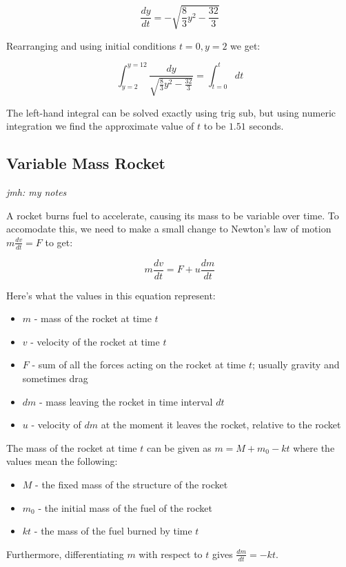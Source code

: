 \documentclass{article}
\begin{document}
\[ \frac{dy}{dt} = -\sqrt{\frac{8}{3}y^2 - \frac{32}{3}} \tag{h} \]

Rearranging and using initial conditions $t = 0, y = 2$ we get:

\[ \int_{y=2}^{y=12} \frac{dy}{\sqrt{\frac{8}{3}y^2-\frac{32}{3}}} = \int_{t=0}^{t} dt \tag{i} \]

The left-hand integral can be solved exactly using trig sub, but using numeric integration we find the approximate value of $t$ to be $1.51$ seconds.

\subsection{Variable Mass Rocket}

\emph{jmh: my notes}

A rocket burns fuel to accelerate, causing its mass to be variable over time. To accomodate this, we need to make a small change to Newton's law of motion $m\frac{dv}{dt} = F$ to get:

\[ m\frac{dv}{dt} = F + u\frac{dm}{dt} \tag{a} \]

Here's what the values in this equation represent:

\begin{itemize}
\item $m$ - mass of the rocket at time $t$
\item $v$ - velocity of the rocket at time $t$
\item $F$ - sum of all the forces acting on the rocket at time $t$; usually gravity and sometimes drag
\item $dm$ - mass leaving the rocket in time interval $dt$
\item $u$ - velocity of $dm$ at the moment it leaves the rocket, relative to the rocket
\end{itemize}

The mass of the rocket at time $t$ can be given as $m = M + m_0 - kt$ where the values mean the following:

\begin{itemize}
\item $M$ - the fixed mass of the structure of the rocket
\item $m_0$ - the initial mass of the fuel of the rocket
\item $kt$ - the mass of the fuel burned by time $t$
\end{itemize}

Furthermore, differentiating $m$ with respect to $t$ gives $\frac{dm}{dt} = -kt$.
\end{document}
